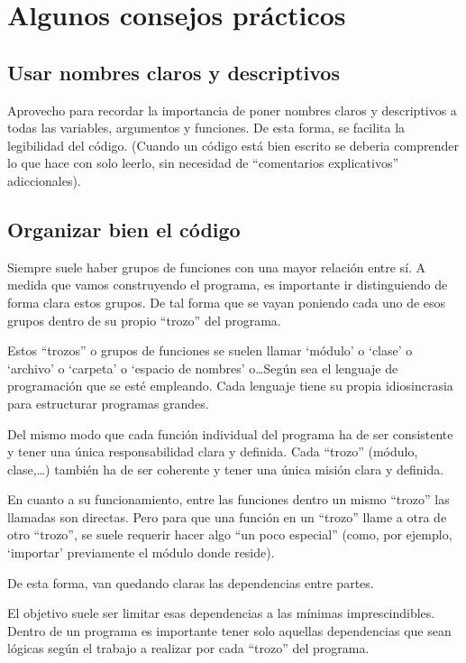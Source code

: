 \documentclass[spanish,12pt,a4paper,final,oneside]{book}
\begin{document}
\section{Algunos consejos prácticos}


\subsection{Usar nombres claros y descriptivos}

Aprovecho para recordar la importancia de poner nombres claros y descriptivos a todas las variables, argumentos y funciones. De esta forma, se facilita la legibilidad del código. (Cuando un código está bien escrito se deberia comprender lo que hace con solo leerlo, sin necesidad de ``comentarios explicativos'' adiccionales).


\subsection{Organizar bien el código}

Siempre suele haber grupos de funciones con una mayor relación entre sí. A medida que vamos construyendo el programa, es importante ir distinguiendo de forma clara estos grupos. De tal forma que se vayan poniendo cada uno de esos grupos dentro de su propio ``trozo'' del programa.

Estos ``trozos'' o grupos de funciones se suelen llamar `módulo' o `clase' o `archivo' o `carpeta' o `espacio de nombres' o\ldots Según sea el lenguaje de programación que se esté empleando. Cada lenguaje tiene su propia idiosincrasia para estructurar programas grandes.

Del mismo modo que cada función individual del programa ha de ser consistente y tener una única responsabilidad clara y definida. Cada ``trozo'' (módulo, clase,\ldots) también ha de ser coherente y tener una única misión clara y definida.

En cuanto a su funcionamiento, entre las funciones dentro un mismo ``trozo'' las llamadas son directas. Pero para que una función en un ``trozo'' llame a otra de otro ``trozo'', se suele requerir hacer algo ``un poco especial'' (como, por ejemplo, `importar' previamente el módulo donde reside).

De esta forma, van quedando claras las dependencias entre partes. 

El objetivo suele ser limitar esas dependencias a las mínimas imprescindibles. Dentro de un programa es importante tener solo aquellas dependencias que sean lógicas según el trabajo a realizar por cada ``trozo'' del programa.
\end{document}
